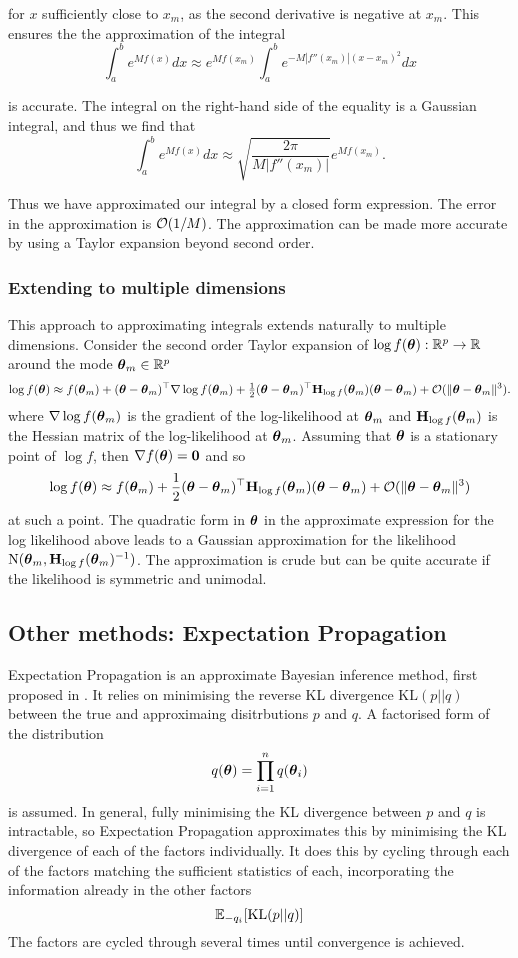 \noindent for $x$ sufficiently close to $x_m$, as the second derivative is negative at $x_m$. This ensures the
the approximation of the integral
$$
	\int_a^b e^{M f(x)} dx \approx e^{M f(x_m)} \int_a^b e^{-M |f''(x_m)|(x - x_m)^2} dx
$$

\noindent is accurate. The integral on the right-hand side of the equality is a Gaussian integral, and thus we
find that
$$
	\int_a^b e^{M f(x)} dx \approx \sqrt{\frac{2 \pi}{M |f''(x_m)|}} e^{M f(x_m)}.
$$

\noindent Thus we have approximated our integral by a closed form expression. The error in the approximation
is $\mathcal{O}(1/M)$. The approximation can be made more accurate by using a Taylor expansion beyond second order.

\subsubsection{Extending to multiple dimensions}
This approach to approximating integrals extends naturally to multiple dimensions. Consider the second order
Taylor expansion of $\log f({\boldsymbol \theta}): {\mathbb{R}}^p \to {\mathbb{R}}$ around the mode ${\boldsymbol \theta}_m \in {\mathbb{R}}^p$
$$
\log f({\boldsymbol \theta}) \approx f({\boldsymbol \theta}_m) + ({\boldsymbol \theta} - {\boldsymbol \theta}_m)^\top \nabla \log f({\boldsymbol \theta}_m) + \tfrac{1}{2} ({\boldsymbol \theta} - {\boldsymbol \theta}_m)^\top {\bf H}_{\log f}({\boldsymbol \theta}_m) ({\boldsymbol \theta} - {\boldsymbol \theta}_m) + \mathcal{O}(\|{\boldsymbol \theta} - {\boldsymbol \theta}_m\|^3).
$$
where $\nabla \log f({\boldsymbol \theta}_m)$ is the gradient of the log-likelihood at ${\boldsymbol \theta}_m$ and ${\bf H}_{\log
f}({\boldsymbol \theta}_m)$ is the Hessian matrix of the log-likelihood at ${\boldsymbol \theta}_m$. Assuming that ${\boldsymbol \theta}$ is a
stationary point of $\log f$, then $\nabla f({\boldsymbol \theta}) = {\bf 0}$ and so
$$
\log f({\boldsymbol \theta}) \approx f({\boldsymbol \theta}_m) + \frac{1}{2} ({\boldsymbol \theta} - {\boldsymbol \theta}_m)^\top {\bf H}_{\log f}({\boldsymbol \theta}_m) ({\boldsymbol \theta} - {\boldsymbol \theta}_m) + \mathcal{O}(\|{\boldsymbol \theta} - {\boldsymbol \theta}_m\|^3)
$$
\noindent at such a point. The quadratic form in ${\boldsymbol \theta}$ in the approximate expression for the log
likelihood above leads to a Gaussian approximation for the likelihood $\text{N}({\boldsymbol \theta}_m, {\bf H}_{\log
f}({\boldsymbol \theta}_m)^{-1})$. The approximation is crude but can be quite accurate if the likelihood is symmetric and
unimodal.

\subsection{Other methods: Expectation Propagation}
Expectation Propagation is an approximate Bayesian inference method, first proposed in \citep{Minka2001}.
It relies on minimising the reverse KL divergence $\text{KL}(p || q)$ between the true and approximaing
disitrbutions $p$ and $q$. A factorised form of the distribution
\[
	q({\boldsymbol \theta}) = \prod_{i=1}^n q({\boldsymbol \theta}_i)
\]
is assumed. In general, fully minimising the KL divergence between $p$ and $q$ is intractable, so Expectation
Propagation approximates this by minimising the KL divergence of each of the factors individually.
It does this by cycling through each of the factors matching the sufficient statistics of each, incorporating
the information already in the other factors
\[
	{\mathbb E}_{-q_i} [\text{KL}(p || q)]
\]
The factors are cycled through several times until convergence is achieved.

